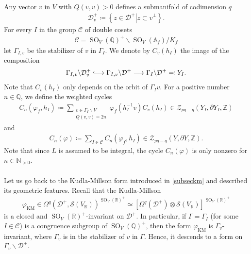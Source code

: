 \documentclass[11pt]{article} %
\newcommand{\8}{\infty}
\newcommand{\Z}{\mathbb{Z}}
\newcommand{\NN}{\mathbb{N}}
\newcommand{\SO}{\operatorname{SO}}
\newcommand{\KM}{\operatorname{KM}}
\newcommand{\D}{\mathcal{D}}
\newcommand{\R}{\mathbb{R}}
\newcommand{\A}{\mathbb{A}}
\newcommand{\Q}{\mathbb{Q}}
\newcommand{\Scal}{\mathcal{S}}
\newcommand{\Ccal}{\mathcal{C}}
\newcommand{\Zcal}{\mathcal{Z}}
\newcommand{\fin}{f}
\newcommand{\hooklongrightarrow}{\lhook\joinrel\longrightarrow}
\theoremstyle{mytheoremstyle}
\theoremstyle{remark}
\numberwithin{equation}{section}
\begin{document}
\subsubsection{} Any vector $v$ in $V$ with $Q(v,v)>0$ defines a submanifold of codimension $q$
\begin{align}
    \D^+_{v} \coloneqq \left \{ z \in \D^+ \left \vert z \subset v^\perp \right . \right \}.
\end{align}
For every $I$ in the group $\Ccal$ of double cosets 
\begin{align}
    \Ccal = \SO_V(\Q)^+ \backslash \SO_V(\A_\fin)/K_\fin
\end{align}
let $\Gamma_{I,v}$ be the stabilizer of $v$ in $\Gamma_I$. We denote by $C_v(h_I)$ the image of the composition
\begin{align}
\Gamma_{I,v} \backslash \D^+_v \hooklongrightarrow \Gamma_{I,v} \backslash \D^+ \longrightarrow \Gamma_I \backslash \D^+ \eqqcolon Y_I. \end{align}
Note that $C_v(h_I)$ only depends on the orbit of $\Gamma_I v$. For a positive number $n \in \Q$, we define the weighted cycles 
\begin{align}
    C_n(\varphi_\fin,h_I) \coloneqq \sum_{\substack{ v \in \Gamma_I \backslash V \\ Q(v,v)=2n}} \varphi_\fin(h_I^{-1}v)C_v(h_I) \in \Zcal_{pq-q}(Y_I,\partial Y_I,\Z)
\end{align}
and
\begin{align}
    C_n(\varphi) \coloneqq \sum_{I \in \Ccal} C_n(\varphi_\fin,h_I) \in \Zcal_{pq-q}(Y,\partial Y,\Z).
\end{align}
Note that since $L$ is assumed to be integral, the cycle $C_n(\varphi)$ is only nonzero for $n \in \NN_{>0}$.
\subsubsection{}
Let us go back to the Kudla-Millson form introduced in \ref{subseckm} and described its geometric features. Recall that the Kudla-Millson
\begin{align}
    \varphi_{\KM} \in \Omega^{q}(\D^+,\Scal(V_\R))^{\SO_V(\R)^+} \simeq \left [\Omega^{q}(\D^+) \otimes \Scal(V_\R) \right ]^{\SO_V(\R)^+}
\end{align}
is a closed and $\SO_V(\R)^+$-invariant on $\D^+$. In particular, if $\Gamma=\Gamma_I$ (for some $I \in \Ccal$) is a congruence subgroup of $\SO_{V}(\Q)^+$, then the form $\varphi_{\KM}$ is $\Gamma_v$-invariant, where $\Gamma_v$ is in the stabilizer of $v$ in $\Gamma$. Hence, it descends to a form on $\Gamma_v \backslash \D^+$. 
\end{document}
